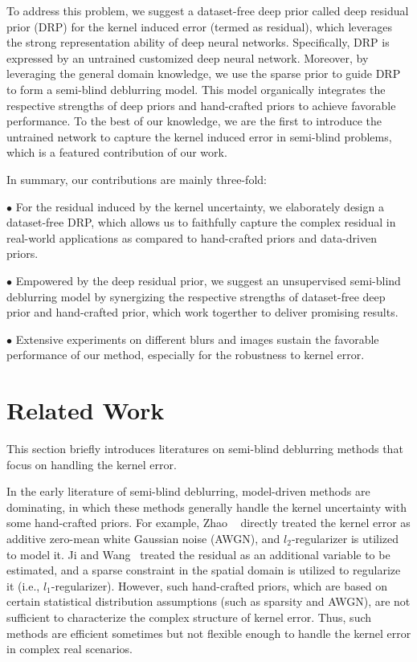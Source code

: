 \documentclass[10pt,twocolumn,letterpaper]{article}
\begin{document}
	To address this problem, we suggest a dataset-free deep prior called deep residual prior (DRP) for the kernel induced error (termed as residual), which leverages the strong representation ability of deep neural networks. Specifically, DRP is expressed by an untrained customized deep neural network. Moreover, by leveraging the general domain knowledge, we use the sparse prior to guide DRP to form a semi-blind deblurring model. This model organically integrates the respective strengths of deep priors and hand-crafted priors to achieve favorable performance. To the best of our knowledge, we are the first to introduce the untrained network to capture the kernel induced error  in semi-blind problems, which is a featured contribution of our work.
	
	In summary,	our contributions are mainly three-fold:
	
	\noindent
	$\bullet$  For the residual induced by the kernel uncertainty, we elaborately design a dataset-free DRP, which allows us to faithfully capture the complex residual in real-world applications as compared to hand-crafted priors and data-driven priors.
	
	\noindent 
	$\bullet$ Empowered by the deep residual prior, we suggest an unsupervised semi-blind deblurring model by synergizing the respective strengths of dataset-free deep prior and hand-crafted prior, which work togerther to deliver promising results.
	
	\noindent
	$\bullet$  Extensive experiments on different blurs and images sustain the favorable performance of our method, especially for the robustness to kernel error.
	
	\section{Related Work}
	This section briefly introduces literatures on semi-blind deblurring methods that focus on handling the kernel error. 
	
	In the early literature of semi-blind deblurring, model-driven methods are dominating, in which these methods generally handle the kernel  uncertainty with some hand-crafted priors. For example,
	Zhao \etal~\cite{Zhao2013TotalVS} directly treated the kernel error as additive zero-mean white Gaussian  noise (AWGN), and $l_2$-regularizer is utilized to model it.  Ji and Wang~\cite{ji2011robust} treated the residual as an additional variable to be estimated, and  a sparse constraint in the spatial domain is utilized to regularize it (i.e., $l_1$-regularizer). However, such hand-crafted priors, which are based on certain statistical distribution assumptions (such as sparsity and AWGN), are not sufficient to characterize the complex structure of kernel error. Thus, such methods are efficient sometimes but not flexible enough to handle the kernel error in complex real scenarios. 
	
\end{document}
